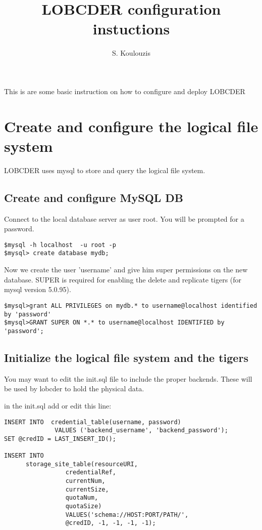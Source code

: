 \documentclass[a4paper,10pt]{article}
\title{LOBCDER configuration instuctions}
\author{S. Koulouzis}
\date{}
\begin{document}
\maketitle
This is are some basic instruction on how to configure and deploy LOBCDER 

\section{Create and configure the logical file system}
LOBCDER uses mysql to store and query the logical file system.

\subsection{Create and configure MySQL DB}
Connect to the local database server as user root. You will be prompted for a password.

\begin{lstlisting}
$mysql -h localhost  -u root -p
$mysql> create database mydb;
\end{lstlisting}


Now we create the user 'username' and give him super permissions on the new database. SUPER is required for enabling the delete and replicate tigers (for mysql version 5.0.95). 
\begin{lstlisting}
$mysql>grant ALL PRIVILEGES on mydb.* to username@localhost identified by 'password'
$mysql>GRANT SUPER ON *.* to username@localhost IDENTIFIED by 'password';
\end{lstlisting}


\subsection{Initialize the logical file system and the tigers}
You may want to edit the init.sql file to include the proper backends. These will be used by lobcder to hold the physical data.

in the init.sql add or edit this line: 

\begin{lstlisting}
INSERT INTO  credential_table(username, password) 
			  VALUES ('backend_username', 'backend_password');
SET @credID = LAST_INSERT_ID();

INSERT INTO 
	  storage_site_table(resourceURI, 
			     credentialRef, 
			     currentNum, 
			     currentSize, 
			     quotaNum, 
			     quotaSize)
			     VALUES('schema://HOST:PORT/PATH/', 
			     @credID, -1, -1, -1, -1);
\end{lstlisting}
\end{document}
